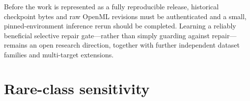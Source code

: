 \documentclass[a4paper,fleqn]{cas-sc}
\begin{document}
Before the work is represented as a fully reproducible release, historical checkpoint bytes and raw OpenML revisions must be authenticated and a small, pinned-environment inference rerun should be completed. Learning a reliably beneficial selective repair gate---rather than simply guarding against repair---remains an open research direction, together with further independent dataset families and multi-target extensions.

\appendix
\section{Rare-class sensitivity}
\begin{table}
\centering
\caption{Rare-class exclusion sensitivity at the 256-row cap. Positive effects mean Selective CoRe is worse than arithmetic pooling.}
\end{table}
\end{document}
